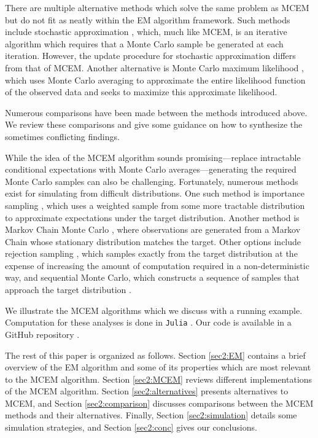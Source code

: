 \documentclass[11pt, oneside]{article}   	%
\begin{document}
There are multiple alternative methods which solve the same problem as MCEM but do not fit as neatly within the EM algorithm framework. Such methods include stochastic approximation \citep{Rob51}, which, much like MCEM, is an iterative algorithm which requires that a Monte Carlo sample be generated at each iteration. However, the update procedure for stochastic approximation differs from that of MCEM. Another alternative is Monte Carlo maximum likelihood \citep{Gey91}, which uses Monte Carlo averaging to approximate the entire likelihood function of the observed data and seeks to maximize this approximate likelihood.

Numerous comparisons have been made between the methods introduced above. We review these comparisons and give some guidance on how to synthesize the sometimes conflicting findings. 

While the idea of the MCEM algorithm sounds promising---replace intractable conditional expectations with Monte Carlo averages---generating the required Monte Carlo samples can also be challenging. Fortunately, numerous methods exist for simulating from difficult distributions. One such method is importance sampling \citep{Rob04}, which uses a weighted sample from some more tractable distribution to approximate expectations under the target distribution. Another method is Markov Chain Monte Carlo \citep{Gel13}, where observations are generated from a Markov Chain whose stationary distribution matches the target. Other options include rejection sampling \citep{Cho20}, which samples exactly from the target distribution at the expense of increasing the amount of computation required in a non-deterministic way, and sequential Monte Carlo, which constructs a sequence of samples that approach the target distribution \citep{Del06}.

We illustrate the MCEM algorithms which we discuss with a running example. Computation for these analyses is done in \texttt{Julia} \citep{Bez17}. Our code is available in a GitHub repository \citep{Rut23I}.

The rest of this paper is organized as follows. Section \ref{sec2:EM} contains a brief overview of the EM algorithm and some of its properties which are most relevant to the MCEM algorithm. Section \ref{sec2:MCEM} reviews different implementations of the MCEM algorithm. Section \ref{sec2:alternatives} presents alternatives to MCEM, and Section \ref{sec2:comparison} discusses comparisons between the MCEM methods and their alternatives. Finally, Section \ref{sec2:simulation} details some simulation strategies, and Section \ref{sec2:conc} gives our conclusions.
\end{document}
